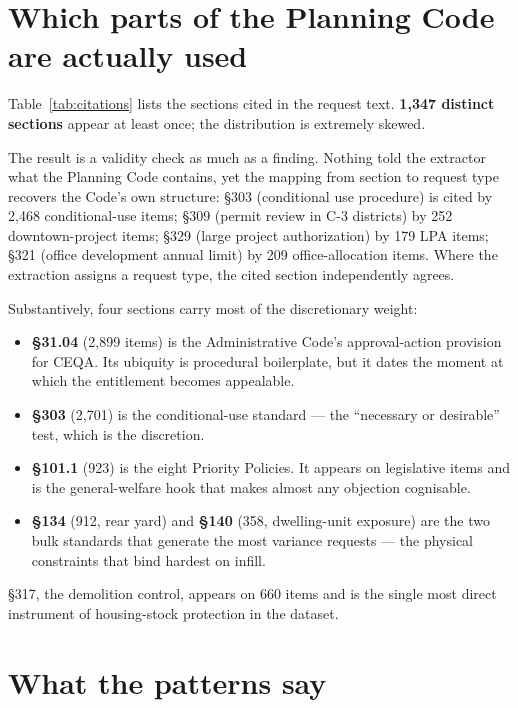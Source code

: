 \documentclass[11pt]{article}
\begin{document}
\section{Which parts of the Planning Code are actually used}

Table~\ref{tab:citations} lists the sections cited in the request text. \textbf{1{,}347
distinct sections} appear at least once; the distribution is extremely skewed.

The result is a validity check as much as a finding. Nothing told the extractor what the
Planning Code contains, yet the mapping from section to request type recovers the Code's own
structure: \S303 (conditional use procedure) is cited by 2{,}468 conditional-use items;
\S309 (permit review in C-3 districts) by 252 downtown-project items; \S329 (large project
authorization) by 179 LPA items; \S321 (office development annual limit) by 209
office-allocation items. Where the extraction assigns a request type, the cited section
independently agrees.

Substantively, four sections carry most of the discretionary weight:

\begin{itemize}
\item \textbf{\S31.04} (2{,}899 items) is the Administrative Code's approval-action provision
for CEQA. Its ubiquity is procedural boilerplate, but it dates the moment at which the
entitlement becomes appealable.
\item \textbf{\S303} (2{,}701) is the conditional-use standard --- the ``necessary or
desirable'' test, which is the discretion.
\item \textbf{\S101.1} (923) is the eight Priority Policies. It appears on legislative items
and is the general-welfare hook that makes almost any objection cognisable.
\item \textbf{\S134} (912, rear yard) and \textbf{\S140} (358, dwelling-unit exposure) are the
two bulk standards that generate the most variance requests --- the physical constraints that
bind hardest on infill.
\end{itemize}

\S317, the demolition control, appears on 660 items and is the single most direct instrument
of housing-stock protection in the dataset.

\section{What the patterns say}
\end{document}
